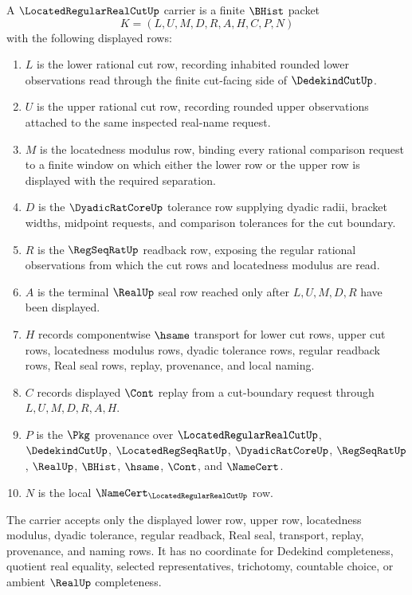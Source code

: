\begin{definition}
\label{def:located-regular-real-cut-carrier}
A $\LocatedRegularRealCutUp$ carrier is a finite $\BHist$ packet
$$
K=(L,U,M,D,R,A,H,C,P,N)
$$
with the following displayed rows:
\begin{enumerate}
\item $L$ is the lower rational cut row, recording inhabited rounded lower observations read through the finite cut-facing side of $\DedekindCutUp$.
\item $U$ is the upper rational cut row, recording rounded upper observations attached to the same inspected real-name request.
\item $M$ is the locatedness modulus row, binding every rational comparison request to a finite window on which either the lower row or the upper row is displayed with the required separation.
\item $D$ is the $\DyadicRatCoreUp$ tolerance row supplying dyadic radii, bracket widths, midpoint requests, and comparison tolerances for the cut boundary.
\item $R$ is the $\RegSeqRatUp$ readback row, exposing the regular rational observations from which the cut rows and locatedness modulus are read.
\item $A$ is the terminal $\RealUp$ seal row reached only after $L,U,M,D,R$ have been displayed.
\item $H$ records componentwise $\hsame$ transport for lower cut rows, upper cut rows, locatedness modulus rows, dyadic tolerance rows, regular readback rows, Real seal rows, replay, provenance, and local naming.
\item $C$ records displayed $\Cont$ replay from a cut-boundary request through $L,U,M,D,R,A,H$.
\item $P$ is the $\Pkg$ provenance over $\LocatedRegularRealCutUp$, $\DedekindCutUp$, $\LocatedRegSeqRatUp$, $\DyadicRatCoreUp$, $\RegSeqRatUp$, $\RealUp$, $\BHist$, $\hsame$, $\Cont$, and $\NameCert$.
\item $N$ is the local $\NameCert_{\LocatedRegularRealCutUp}$ row.
\end{enumerate}
The carrier accepts only the displayed lower row, upper row, locatedness modulus, dyadic tolerance, regular readback, Real seal, transport, replay, provenance, and naming rows. It has no coordinate for Dedekind completeness, quotient real equality, selected representatives, trichotomy, countable choice, or ambient $\RealUp$ completeness.
\end{definition}

